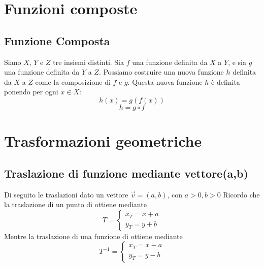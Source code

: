\documentclass{book}
\begin{document}
\section{Funzioni composte}
\begin{definition}
    \subsection{Funzione Composta}
    Siano \( X \), \( Y \) e \( Z \) tre insiemi distinti. Sia \( f \) una funzione definita da \( X \) a \( Y \), e sia \( g \) una funzione definita da \( Y \) a \( Z \). Possiamo costruire una nuova funzione \( h \) definita da \( X \) a \( Z \) come la composizione di \( f \) e \( g \). Questa nuova funzione \( h \) è definita ponendo per ogni \( x \in X \):
    \[ h(x) = g(f(x)) \]
    \[h = g \circ f\]
\end{definition}

\section{Trasformazioni geometriche}
\begin{definition}
    \subsection{Traslazione di funzione mediante vettore(a,b)}
    Di seguito le traslazioni dato un vettore
    \( \vec{v} = (a,b)\text{, con }a>0, b>0 \)
    Ricordo che la traslazione di un punto di ottiene mediante
    \[T=\begin{cases}
            x_T=x+a \\
            y_T=y+b
        \end{cases}\]
    Mentre la traslazione di una funzione di ottiene mediante
    \[T^{-1}=\begin{cases}
            x_T=x-a \\
            y_T=y-b
        \end{cases}\]
\end{definition}
\end{document}
